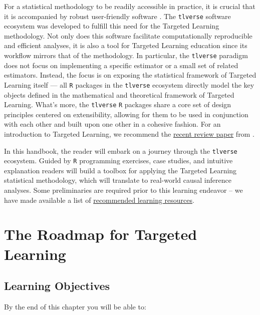 \documentclass[12pt, krantz2,]{krantz}
\newcommand{\passthrough}[1]{#1}
\theoremstyle{definition}
\theoremstyle{definition}
\theoremstyle{definition}
\newcommand{\1}{\mathbbm{1}}
\begin{document}
For a statistical methodology to be readily accessible in practice, it is
crucial that it is accompanied by robust user-friendly software
\citep{pullenayegum2016knowledge, stromberg2004write}. The \passthrough{\lstinline!tlverse!} software
ecosystem was developed to fulfill this need for the Targeted Learning
methodology. Not only does this software facilitate computationally reproducible
and efficient analyses, it is also a tool for Targeted Learning education since
its workflow mirrors that of the methodology. In particular, the \passthrough{\lstinline!tlverse!}
paradigm does not focus on implementing a specific estimator or a small set of
related estimators. Instead, the focus is on exposing the statistical framework
of Targeted Learning itself --- all \passthrough{\lstinline!R!} packages in the \passthrough{\lstinline!tlverse!} ecosystem
directly model the key objects defined in the mathematical and theoretical
framework of Targeted Learning. What's more, the \passthrough{\lstinline!tlverse!} \passthrough{\lstinline!R!} packages share a
core set of design principles centered on extensibility, allowing for them to be
used in conjunction with each other and built upon one other in a cohesive
fashion. For an introduction to Targeted Learning, we recommend the \href{https://arxiv.org/abs/2006.07333}{recent
review paper} from \citet{coyle2021targeted}.

In this handbook, the reader will embark on a journey through the \passthrough{\lstinline!tlverse!}
ecosystem. Guided by \passthrough{\lstinline!R!} programming exercises, case studies, and
intuitive explanation readers will build a toolbox for applying the Targeted
Learning statistical methodology, which will translate to real-world causal
inference analyses. Some preliminaries are required prior to this learning
endeavor -- we have made available a list of \protect\hyperlink{learn}{recommended learning
resources}.

\hypertarget{intro}{%
\chapter{The Roadmap for Targeted Learning}\label{intro}}

\hypertarget{learning-objectives}{%
\section*{Learning Objectives}\label{learning-objectives}}


By the end of this chapter you will be able to:
\end{document}
